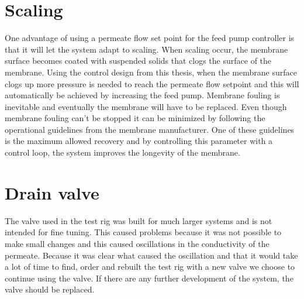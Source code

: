 \section{Scaling}
One advantage of using a permeate flow set point for the feed pump controller is that it will let the system adapt to scaling. When scaling occur, the membrane surface becomes coated with suspended solids that clogs the surface of the membrane. Using the control design from this thesis, when the membrane surface clogs up more pressure is needed to reach the permeate flow setpoint and this will automatically be achieved by increasing the feed pump. Membrane fouling is inevitable and eventually the membrane will have to be replaced. Even though membrane fouling can't be stopped it can be minimized by following the operational guidelines from the membrane manufacturer. One of these guidelines is the maximum allowed recovery and by controlling this parameter with a control loop, the system improves the longevity of the membrane. 

\section{Drain valve}
The valve used in the test rig was built for much larger systems and is not intended for fine tuning. This caused problems because it was not possible to make small changes and this caused oscillations in the conductivity of the permeate. Because it was clear what caused the oscillation and that it would take a lot of time to find, order and rebuilt the test rig with a new valve we choose to continue using the valve. If there are any further development of the system, the valve should be replaced.\\
\\